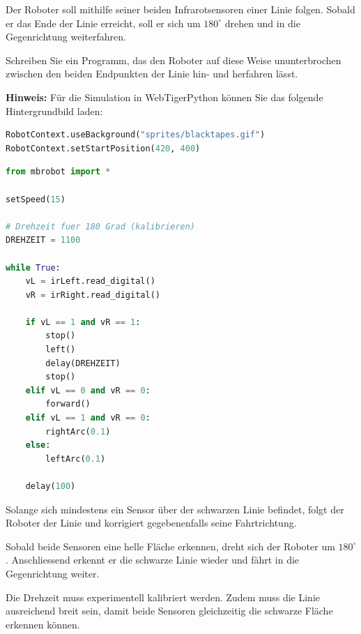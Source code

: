 \begin{myexercise}
    Der Roboter soll mithilfe
    seiner beiden Infrarotsensoren einer Linie folgen.
    Sobald er das Ende der Linie erreicht, soll er
    sich um \(180^\circ\) drehen und in die Gegenrichtung
    weiterfahren.

    Schreiben Sie ein Programm, das den Roboter auf
    diese Weise ununterbrochen zwischen den beiden
    Endpunkten der Linie hin- und herfahren lässt.

    \textbf{Hinweis:} Für die Simulation in WebTigerPython
    können Sie das folgende Hintergrundbild laden:

    \begin{lstlisting}[language=Python]
RobotContext.useBackground("sprites/blacktapes.gif")
RobotContext.setStartPosition(420, 400)
\end{lstlisting}

    \begin{myanswer}
        \begin{lstlisting}[language=Python]
from mbrobot import *

setSpeed(15)

# Drehzeit fuer 180 Grad (kalibrieren)
DREHZEIT = 1100

while True:
    vL = irLeft.read_digital()
    vR = irRight.read_digital()

    if vL == 1 and vR == 1:
        stop()
        left()
        delay(DREHZEIT)
        stop()
    elif vL == 0 and vR == 0:
        forward()
    elif vL == 1 and vR == 0:
        rightArc(0.1)
    else:
        leftArc(0.1)

    delay(100)
        \end{lstlisting}

        Solange sich mindestens ein Sensor über der
        schwarzen Linie befindet, folgt der Roboter
        der Linie und korrigiert gegebenenfalls
        seine Fahrtrichtung.

        Sobald beide Sensoren eine helle Fläche
        erkennen, dreht sich der Roboter um
        \(180^\circ\). Anschliessend erkennt er
        die schwarze Linie wieder und fährt in
        die Gegenrichtung weiter.

        Die Drehzeit muss experimentell kalibriert
        werden. Zudem muss die Linie ausreichend
        breit sein, damit beide Sensoren gleichzeitig
        die schwarze Fläche erkennen können.
    \end{myanswer}
\end{myexercise}


